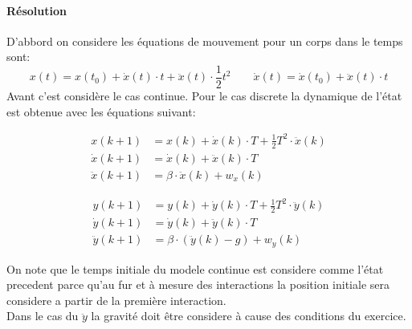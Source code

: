 \documentclass{article}
\begin{document}
\paragraph{Résolution}D'abbord on considere les équations de mouvement pour un corps dans le temps sont:
\begin{equation*}
    x(t) = x(t_0) + \dot{x}(t) \cdot t + \ddot{x}(t) \cdot \frac{1}{2}t^2
    \qquad
    \dot{x}(t) = \dot{x}(t_0) + \ddot{x}(t) \cdot t
\end{equation*}
Avant c'est considère le cas continue. Pour le cas discrete la dynamique de l'état est obtenue avec les équations suivant:
\begin{center}
    \begin{minipage}{0.45\textwidth}
        \begin{align*}
            x(k+1)        &= x(k) + \dot{x}(k) \cdot T + \frac{1}{2}T^2 \cdot \ddot{x}(k)\\
            \dot{x}(k+1)  &= \dot{x}(k) + \ddot{x}(k) \cdot T\\
            \ddot{x}(k+1) &= \beta \cdot \ddot{x}(k) + w_{x}(k)
        \end{align*}
    \end{minipage}
    \begin{minipage}{0.45\textwidth}
        \begin{align*}
            y(k+1)        &= y(k) + \dot{y}(k) \cdot T + \frac{1}{2}T^2 \cdot \ddot{y}(k)\\
            \dot{y}(k+1)  &= \dot{y}(k) + \ddot{y}(k) \cdot T\\
            \ddot{y}(k+1) &= \beta \cdot (\ddot{y}(k) - g) + w_{y}(k)
        \end{align*}
    \end{minipage}
\end{center}
On note que le temps initiale du modele continue est considere comme l'état precedent parce qu'au fur et à mesure des interactions la position initiale sera considere a partir de la première interaction.\\

\noindent Dans le cas du $\ddot{y}$ la gravité doit être considere à cause des conditions du exercice.\\
\end{document}
